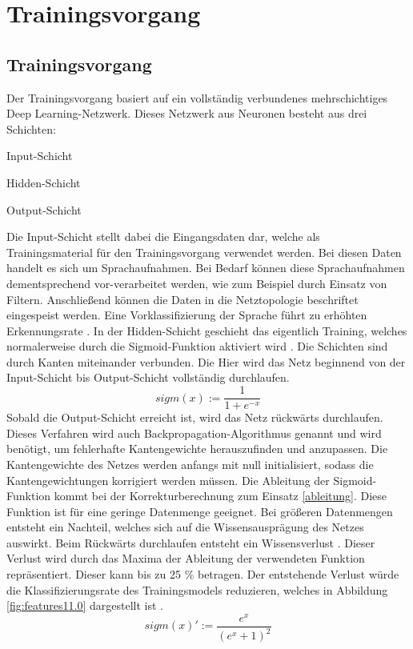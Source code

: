 \section{Trainingsvorgang}

\subsection{Trainingsvorgang}
Der Trainingsvorgang basiert auf ein vollständig verbundenes mehrschichtiges Deep Learning-Netzwerk. Dieses Netzwerk aus Neuronen besteht aus drei Schichten:
\begin{description}
	\item Input-Schicht
	\item Hidden-Schicht 
	\item Output-Schicht
\end{description}
Die Input-Schicht stellt dabei die Eingangsdaten dar, welche als Trainingsmaterial für den Trainingsvorgang verwendet werden. Bei diesen Daten handelt es sich um Sprachaufnahmen. Bei Bedarf können diese Sprachaufnahmen dementsprechend vor-verarbeitet werden, wie zum Beispiel durch Einsatz von Filtern. Anschließend können die Daten in die Netztopologie beschriftet eingespeist werden. Eine Vorklassifizierung der Sprache führt zu erhöhten Erkennungsrate \cite{bishop.2006}. In der Hidden-Schicht geschieht das eigentlich Training, welches normalerweise durch die Sigmoid-Funktion aktiviert wird \cite{bishop.2006}. Die Schichten sind durch Kanten miteinander verbunden. Die Hier wird das Netz beginnend von der Input-Schicht bis Output-Schicht vollständig durchlaufen. 
\begin{equation*}
sigm(x) :=\frac{ 1 }{1+e^{-x}  }
\label{normal}
\end{equation*}
Sobald die Output-Schicht erreicht ist, wird das Netz rückwärts durchlaufen. Dieses Verfahren wird auch Backpropagation-Algorithmus genannt und wird benötigt, um fehlerhafte Kantengewichte herauszufinden und anzupassen. Die Kantengewichte des Netzes werden anfangs mit null initialisiert, sodass die Kantengewichtungen korrigiert werden müssen. Die Ableitung der Sigmoid-Funktion kommt bei der Korrekturberechnung zum Einsatz \ref{ableitung}. Diese Funktion ist für eine geringe Datenmenge geeignet. Bei größeren Datenmengen entsteht ein Nachteil, welches sich auf die Wissensausprägung des Netzes auswirkt. Beim Rückwärts durchlaufen entsteht ein Wissensverlust \cite{bishop.2006}. Dieser Verlust wird durch das Maxima der Ableitung der verwendeten Funktion repräsentiert. Dieser kann bis zu 25 \% betragen. Der entstehende Verlust würde die Klassifizierungsrate des Trainingsmodels reduzieren, welches in Abbildung \ref{fig:features11.0} dargestellt ist \cite{Kulbear.2017}.
\begin{equation*}
sigm(x)':= \frac{ e^{x} }{(e^{x} +1)^2  }
\label{ableitung}
\end{equation*}


